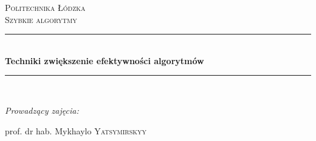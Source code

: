 \pgfplotsset{compat=newest} %


\setcounter{secnumdepth}{4}
\setcounter{tocdepth}{4}
\addto\captionsenglish{%
  \renewcommand{\contentsname}%
    {Spis treści}%
}




\begin{titlepage}

\newcommand{\HRule}{\rule{\linewidth}{0.5mm}} %

\center %
 

\textsc{\LARGE Politechnika Łódzka}\\[1.5cm] %
\textsc{\Large Szybkie algorytmy}\\[0.5cm] %


\HRule \\[0.4cm]
{ \huge \bfseries Techniki zwiększenie efektywności algorytmów }\\[0.4cm] %
\HRule \\[1.5cm]
 



\begin{flushleft}\large

\begin{center} \emph{Prowadzący zajęcia:} \end{center}
\begin{center}
prof. dr hab. Mykhaylo \textsc{Yatsymirskyy}
\end{center} %
\end{flushleft}



\end{titlepage}
